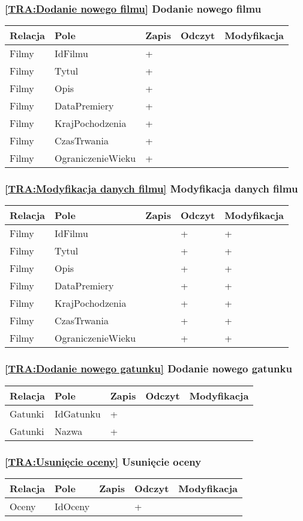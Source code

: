 \subsubsection*{\ref{TRA:Dodanie nowego filmu} Dodanie nowego filmu}
\begin{tabularx}{\textwidth}{|Y|Y|Y|Y|Y|}\hline
Relacja & Pole & Zapis & Odczyt & Modyfikacja \\\hline
Filmy & IdFilmu & + &  & \\
Filmy & Tytul & + &  & \\
Filmy & Opis & + &  & \\
Filmy & DataPremiery & + &  & \\
Filmy & KrajPochodzenia & + &  & \\
Filmy & CzasTrwania & + &  & \\
Filmy & OgraniczenieWieku & + &  & \\
\hline\end{tabularx}
\subsubsection*{\ref{TRA:Modyfikacja danych filmu} Modyfikacja danych filmu}
\begin{tabularx}{\textwidth}{|Y|Y|Y|Y|Y|}\hline
Relacja & Pole & Zapis & Odczyt & Modyfikacja \\\hline
Filmy & IdFilmu &  & + & +\\
Filmy & Tytul &  & + & +\\
Filmy & Opis &  & + & +\\
Filmy & DataPremiery &  & + & +\\
Filmy & KrajPochodzenia &  & + & +\\
Filmy & CzasTrwania &  & + & +\\
Filmy & OgraniczenieWieku &  & + & +\\
\hline\end{tabularx}
\subsubsection*{\ref{TRA:Dodanie nowego gatunku} Dodanie nowego gatunku}
\begin{tabularx}{\textwidth}{|Y|Y|Y|Y|Y|}\hline
Relacja & Pole & Zapis & Odczyt & Modyfikacja \\\hline
Gatunki & IdGatunku & + &  & \\
Gatunki & Nazwa & + &  & \\
\hline\end{tabularx}
\subsubsection*{\ref{TRA:Usunięcie oceny} Usunięcie oceny}
\begin{tabularx}{\textwidth}{|Y|Y|Y|Y|Y|}\hline
Relacja & Pole & Zapis & Odczyt & Modyfikacja \\\hline
Oceny & IdOceny &  & + & \\
\hline\end{tabularx}
